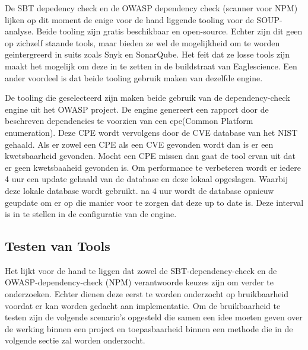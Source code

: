 De SBT depedency check en de OWASP dependency check (scanner voor NPM) lijken op dit moment de enige voor de hand liggende tooling voor de SOUP-analyse. Beide tooling zijn gratis beschikbaar en open-source. Echter zijn dit geen op zichzelf staande tools, maar bieden ze wel de mogelijkheid om te worden geintergreerd in suits zoals Snyk en SonarQube. Het feit dat ze losse tools zijn maakt het mogelijk om deze in te zetten in de buildstraat van Eaglescience. Een ander voordeel is dat beide tooling gebruik maken van dezelfde engine.


De tooling die geselecteerd zijn maken beide gebruik van de dependency-check engine uit het OWASP project.
De engine genereert een rapport door de beschreven dependencies te voorzien van een cpe(Common Platform enumeration). Deze CPE wordt vervolgens door de CVE database van het NIST gehaald. Als er zowel een CPE als een CVE gevonden wordt dan is er een kwetsbaarheid gevonden. Mocht een CPE missen dan gaat de tool ervan uit dat er geen kwetsbaaheid gevonden is. Om performance te verbeteren wordt er iedere 4 uur een update gehaald van de database en deze lokaal opgeslagen. Waarbij deze lokale database wordt gebruikt. na 4 uur wordt de database opnieuw geupdate om er op die manier voor te zorgen dat deze up to date is. Deze interval is in te stellen in de configuratie van de engine.

%
%

\subsection{Testen van Tools}\label{subsec:testen-van-tools}

Het lijkt voor de hand te liggen dat zowel de SBT-dependency-check en de OWASP-dependency-check (NPM) verantwoorde keuzes zijn om verder te onderzoeken. Echter dienen deze eerst te worden onderzocht op bruikbaarheid voordat er kan worden gedacht aan implementatie. Om de bruikbaarheid te testen zijn de volgende scenario's opgesteld die samen een idee moeten geven over de werking binnen een project en toepasbaarheid binnen een methode die in de volgende sectie zal worden onderzocht.

